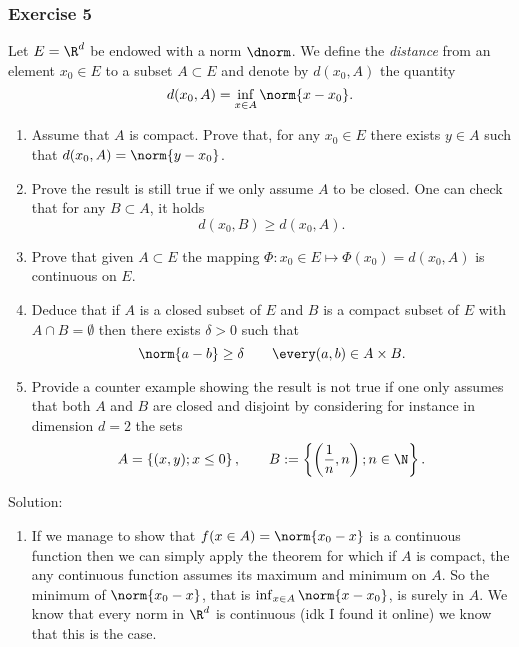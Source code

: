 \subsubsection{Exercise 5} Let $E=\R^{d}$ be endowed with a norm $\dnorm$. We define the \textit{distance} from an element $x_{0}\in E$ to a subset $A\subset E$ and denote by $d(x_{0},A)$ the quantity
\begin{equation*}
	d(x_{0},A)=\inf_{x\in A}\norm{x-x_{0}}.
\end{equation*}\begin{enumerate}
\item Assume that $A$ is compact. Prove that, for any $x_{0}\in E$ there exists $y\in A$ such that $d(x_{0},A)=\norm{y-x_{0}}$.
\item Prove the result is still true if we only assume $A$ to be closed. One can check that for any $B\subset A$, it holds 
\begin{equation*}
	d(x_{0},B)\geq d(x_{0},A).
\end{equation*}
\item Prove that given $A\subset E$ the mapping $\Phi:x_{0}\in E\mapsto\Phi(x_{0})=d(x_{0},A)$ is continuous on $E$.
\item Deduce that if $A$ is a closed subset of $E$ and $B$ is a compact subset of $E$ with $A\cap B=\emptyset$ then there exists $\delta>0$ such that
\begin{equation*}
	\norm{a-b}\geq\delta\qquad\every(a,b)\in A\times B.
\end{equation*}
\item Provide a counter example showing the result is not true if one only assumes that both $A$ and $B$ are closed and disjoint by considering for instance in dimension $d=2$ the sets
\begin{equation*}
	A=\left\{(x,y);x\leq0\right\},\qquad B:=\left\{\left(\frac{1}{n},n\right);n\in\N\right\}.
\end{equation*}
\end{enumerate}
Solution:
\begin{enumerate}
	\item If we manage to show that $f(x\in A)=\norm{x_{0}-x}$ is a continuous function then we can simply apply the theorem for which if $A$ is compact, the any continuous function assumes its maximum and minimum on $A$. So the minimum of $\norm{x_{0}-x}$, that is $\inf_{x\in A}\norm{x-x_{0}}$, is surely in $A$.
	We know that every norm in $\R^{d}$ is continuous (idk I found it online) we know that this is the case.
\end{enumerate}